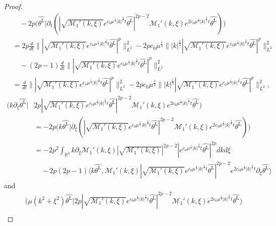 \documentclass[reqno, 12pt]{amsart} %
\theoremstyle{plain} %
\theoremstyle{definition}
\theoremstyle{remark}
\numberwithin{equation}{section} %
\newcommand{\pt}{\partial_t}
\begin{document}
\begin{proof}
\begin{align*}
			& \quad - 2p\big(  \widehat{\theta^{\mathrm{L}}} \big| \pt ( | \sqrt{\mathcal{M}_1'(k, \xi)} e^{c_0 \mu^\frac13 |k|^\frac23 t} \widehat{\theta^{\mathrm{L}} }|^{2p-2} \mathcal{M}_1'(k, \xi) e^{2c_0 \mu^\frac13 |k|^\frac23 t} \widehat{\theta^{\mathrm{L}} } ) \big)\\
			&= 2p \frac{d}{dt} \| | \sqrt{\mathcal{M}_1'(k, \xi)} e^{c_0 \mu^\frac13 |k|^\frac23 t} \widehat{\theta^{\mathrm{L}} }|^p \|_{L^2}^2 - 2p c_0 \mu^\frac13 \| |k|^\frac13 | \sqrt{\mathcal{M}_1'(k, \xi)} e^{c_0 \mu^\frac13 |k|^\frac23 t} \widehat{\theta^{\mathrm{L}} }|^p\|_{L^2}^2 \\
			& \quad - (2p  -1 ) \frac{d}{dt} \| | \sqrt{\mathcal{M}_1'(k, \xi)} e^{c_0 \mu^\frac13 |k|^\frac23 t} \widehat{\theta^{\mathrm{L}} }|^p \|_{L^2}^2 \\
			&=  \frac{d}{dt} \| | \sqrt{\mathcal{M}_1'(k, \xi)} e^{c_0 \mu^\frac13 |k|^\frac23 t} \widehat{\theta^{\mathrm{L}} }|^p \|_{L^2}^2  - 2p c_0 \mu^\frac13 \| |k|^\frac13 | \sqrt{\mathcal{M}_1'(k, \xi)} e^{c_0 \mu^\frac13 |k|^\frac23 t} \widehat{\theta^{\mathrm{L}} }|^p\|_{L^2}^2 ,
		\end{align*}
		\begin{align*}
			\big( k\partial_\xi  \widehat{\theta^{\mathrm{L}}} \big| &2p | \sqrt{\mathcal{M}_1'(k, \xi)} e^{c_0 \mu^\frac13 |k|^\frac23 t} \widehat{\theta^{\mathrm{L}} }|^{2p-2} \mathcal{M}_1'(k, \xi) e^{2c_0 \mu^\frac13 |k|^\frac23 t} \widehat{\theta^{\mathrm{L}} } \big) \\
			&=  - 2p \big( k \widehat{\theta^{\mathrm{L}}} \big| \partial_\xi ( | \sqrt{\mathcal{M}_1'(k, \xi)} e^{c_0 \mu^\frac13 |k|^\frac23 t} \widehat{\theta^{\mathrm{L}} }|^{2p-2} \mathcal{M}_1'(k, \xi) e^{2c_0 \mu^\frac13 |k|^\frac23 t} \widehat{\theta^{\mathrm{L}} } ) \big)\\
			&= -2p^2 \int_{\mathbb{R}^2} k\partial_\xi  \mathcal{M}_1'(k, \xi)    | \sqrt{\mathcal{M}_1'(k, \xi)} |^{2p-2} |e^{c_0 \mu^\frac13 |k|^\frac23 t} \widehat{\theta^{\mathrm{L}} }|^{2p} dkd\xi \\
			&\quad  -  2p(2p-1)\langle k \widehat{\theta^{\mathrm{L}}},   \mathcal{M}_1'(k, \xi)  | \sqrt{\mathcal{M}_1'(k, \xi)} e^{c_0 \mu^\frac13 |k|^\frac23 t} \widehat{\theta^{\mathrm{L}} }|^{2p-2}   e^{2c_0 \mu^\frac13 |k|^\frac23 t}    \partial_\xi\widehat{\theta^{\mathrm{L}} } \rangle
		\end{align*}
		and
		\begin{align*}
			&\big( \mu(k^2 + \xi^2) \widehat{\theta^{\mathrm{L}} }  \big| 2p | \sqrt{\mathcal{M}_1'(k, \xi)} e^{c_0 \mu^\frac13 |k|^\frac23 t} \widehat{\theta^{\mathrm{L}} }|^{2p-2} \mathcal{M}_1'(k, \xi) e^{2c_0 \mu^\frac13 |k|^\frac23 t} \widehat{\theta^{\mathrm{L}} } \big) \\

\end{align*}
\end{proof}
\end{document}
